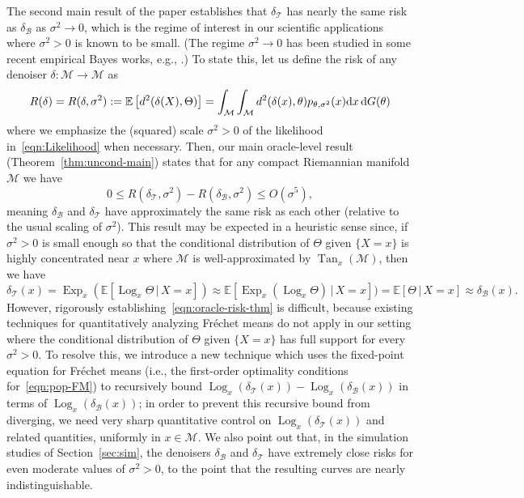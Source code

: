 \documentclass[preprint]{imsart}
\theoremstyle{plain}
\theoremstyle{definition}
\newcommand{\Ebb}{\mathbb{E}}
\newcommand{\Mcal}{\mathcal{M}}
\newcommand{\diff}{\textnormal{d}}
\DeclareMathOperator{\Tan}{Tan}
\newcommand{\B}{\mathcal{B}}
\newcommand{\T}{\mathcal{T}}
\DeclareMathOperator{\Log}{Log}
\DeclareMathOperator{\Exp}{Exp}
\begin{document}
    The second main result of the paper establishes that $\delta_{\T}$ has nearly the same risk as $\delta_{\B}$ as $\sigma^2\to 0$, which is the regime of interest in our scientific applications where $\sigma^2>0$ is known to be small.
    (The regime $\sigma^2\to 0$ has been studied in some recent empirical Bayes works, e.g., \cite{LiangShrinkageI,LiangShrinkageII}.)
    To state this, let us define the risk of any denoiser $\delta:\Mcal\to\Mcal$ as
    \begin{equation}\label{eqn:def-risk}
        R(\delta)=R(\delta,\sigma^2) := \Ebb\left[d^2(\delta(X),\Theta)\right] = \int_{\Mcal}\int_{\Mcal}d^2(\delta(x),\theta)p_{\theta,\sigma^2}(x)\diff x\,\diff G(\theta)
    \end{equation}
    where we emphasize the (squared) scale $\sigma^2>0$ of the likelihood in~\eqref{eqn:Likelihood} when necessary.
    Then, our main oracle-level result (Theorem~\ref{thm:uncond-main}) states that for any compact Riemannian manifold $\Mcal$ we have
    \begin{equation}\label{eqn:oracle-risk-thm}
        0 \le R(\delta_{\T},\sigma^2)-R(\delta_{\B},\sigma^2)  \le O(\sigma^5),
    \end{equation}
    meaning $\delta_{\B}$ and $\delta_{\T}$ have approximately the same risk as each other (relative to the usual scaling of $\sigma^2$).
    This result may be expected in a heuristic sense since, if $\sigma^2>0$ is small enough so that the conditional distribution of $\Theta$ given $\{X = x\}$ is highly concentrated near $x$ where $\Mcal$ is well-approximated by $\Tan_x(\Mcal)$, then we have
    \begin{equation}\label{eqn:deltaT-heuristic}
        \delta_{\T}(x) = \Exp_x(\Ebb[\Log_x\Theta\,|\,X=x]) \approx \Ebb[\Exp_x(\Log_x\Theta)\,|\,X=x]) = \Ebb[\Theta\,|\,X=x] \approx \delta_{\B}(x).
    \end{equation}
    However, rigorously establishing~\eqref{eqn:oracle-risk-thm} is difficult, because existing techniques for quantitatively analyzing Fr\'echet means do not apply in our setting where the conditional distribution of $\Theta$ given $\{X=x\}$ has full support for every $\sigma^2>0$.
    To resolve this, we introduce a new technique which uses the fixed-point equation for Fr\'echet means (i.e., the first-order optimality conditions for~\eqref{eqn:pop-FM}) to recursively bound $\Log_x(\delta_{\T}(x))-\Log_x(\delta_{\B}(x))$ in terms of $\Log_x(\delta_{\B}(x))$; in order to prevent this recursive bound from diverging, we need very sharp quantitative control on $\Log_x(\delta_{\T}(x))$ and related quantities, uniformly in $x\in\Mcal$.
    We also point out that, in the simulation studies of Section~\ref{sec:sim}, the denoisers $\delta_{\B}$ and $\delta_{\T}$ have extremely close risks for even moderate values of $\sigma^2>0$, to the point that the resulting curves are nearly indistinguishable.
  
\end{document}
